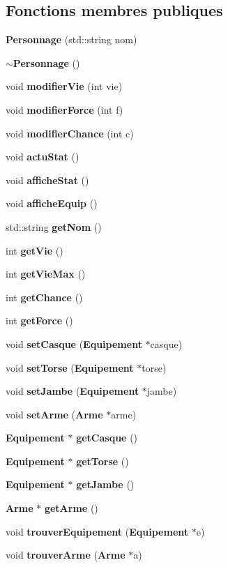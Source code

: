 \subsection*{Fonctions membres publiques}
\begin{DoxyCompactItemize}
\item 
{\bf Personnage} (std\-::string nom)
\item 
{\bf $\sim$\-Personnage} ()
\item 
void {\bf modifier\-Vie} (int vie)
\item 
void {\bf modifier\-Force} (int f)
\item 
void {\bf modifier\-Chance} (int c)
\item 
void {\bf actu\-Stat} ()
\item 
void {\bf affiche\-Stat} ()
\item 
void {\bf affiche\-Equip} ()
\item 
std\-::string {\bf get\-Nom} ()
\item 
int {\bf get\-Vie} ()
\item 
int {\bf get\-Vie\-Max} ()
\item 
int {\bf get\-Chance} ()
\item 
int {\bf get\-Force} ()
\item 
void {\bf set\-Casque} ({\bf Equipement} $\ast$casque)
\item 
void {\bf set\-Torse} ({\bf Equipement} $\ast$torse)
\item 
void {\bf set\-Jambe} ({\bf Equipement} $\ast$jambe)
\item 
void {\bf set\-Arme} ({\bf Arme} $\ast$arme)
\item 
{\bf Equipement} $\ast$ {\bf get\-Casque} ()
\item 
{\bf Equipement} $\ast$ {\bf get\-Torse} ()
\item 
{\bf Equipement} $\ast$ {\bf get\-Jambe} ()
\item 
{\bf Arme} $\ast$ {\bf get\-Arme} ()
\item 
void {\bf trouver\-Equipement} ({\bf Equipement} $\ast$e)
\item 
void {\bf trouver\-Arme} ({\bf Arme} $\ast$a)
\end{DoxyCompactItemize}
